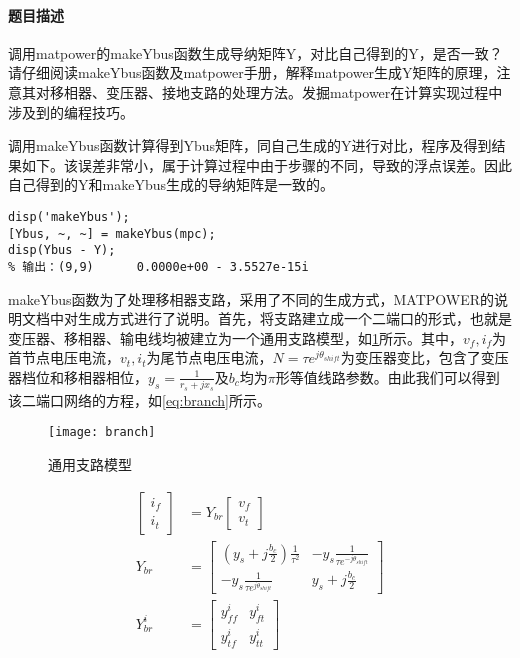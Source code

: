 \documentclass[a4paper,12pt]{article}
\begin{document}
    \paragraph{题目描述} 调用matpower的makeYbus函数生成导纳矩阵Y，对比自己得到的Y，是否一致？请仔细阅读makeYbus函数及matpower手册，解释matpower生成Y矩阵的原理，注意其对移相器、变压器、接地支路的处理方法。发掘matpower在计算实现过程中涉及到的编程技巧。

    调用makeYbus函数计算得到Ybus矩阵，同自己生成的Y进行对比，程序及得到结果如下。该误差非常小，属于计算过程中由于步骤的不同，导致的浮点误差。因此自己得到的Y和makeYbus生成的导纳矩阵是一致的。
    \begin{lstlisting}[style=Matlab-editor,basicstyle=\mlttfamily]
%% makeYbus
disp('makeYbus');
[Ybus, ~, ~] = makeYbus(mpc);
disp(Ybus - Y);
% 输出：(9,9)      0.0000e+00 - 3.5527e-15i
    \end{lstlisting}

    makeYbus函数为了处理移相器支路，采用了不同的生成方式，MATPOWER的说明文档\cite{manual}中对生成方式进行了说明。首先，将支路建立成一个二端口的形式，也就是变压器、移相器、输电线均被建立为一个通用支路模型，如\cref{fig:branch}所示。其中，$v_f,i_f$为首节点电压电流，$v_t,i_t$为尾节点电压电流，$N=\tau e^{j\theta_{shift}}$为变压器变比，包含了变压器档位和移相器相位，$y_s=\frac{1}{r_s+j x_s}$及$b_c$均为$\pi$形等值线路参数。由此我们可以得到该二端口网络的方程，如\cref{eq:branch}所示。

    \begin{figure}
      \texttt{[image: branch]}
      \caption{通用支路模型}
      \label{fig:branch}
    \end{figure}
    \begin{equation}
      \label{eq:branch}
      \begin{aligned}
        \begin{bmatrix}
          i_f\\
          i_t
        \end{bmatrix} &= Y_{br}
        \begin{bmatrix}
          v_f\\
          v_t
        \end{bmatrix} \\
        Y_{br} &= \begin{bmatrix}
          (y_s+j\frac{b_c}{2})\frac{1}{\tau^2} & -y_s\frac{1}{\tau e^{-j\theta_{shift}}} \\
          -y_s\frac{1}{\tau e^{j\theta_{shift}}} & y_s+j\frac{b_c}{2}
      \end{bmatrix}\\
      Y_{br}^i &=
      \begin{bmatrix}
        y_{ff}^i & y_{ft}^i\\
        y_{tf}^i & y_{tt}^i
      \end{bmatrix}
      \end{aligned}
    \end{equation}
\end{document}

